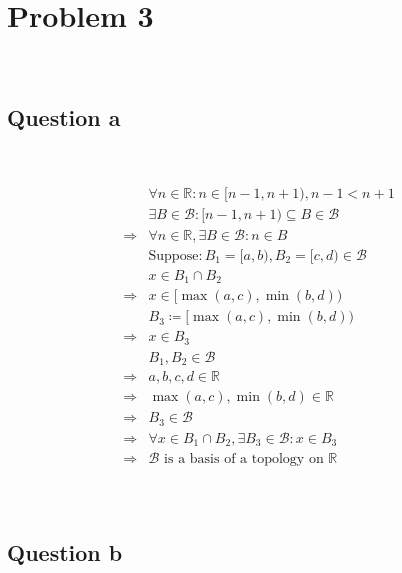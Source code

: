 \documentclass{article}
\begin{document}
\newpage

\section*{Problem 3}

~

\subsection*{Question a}

~

\begin{equation*}
    \begin{split}
        &\forall n \in \mathbb{R}:n\in [n-1,n+1),n-1<n+1\\
        &\exists B\in\mathcal{B} :[n-1,n+1)\subseteq B\in\mathcal{B}\\
        \Rightarrow&\forall n\in\mathbb{R},\exists B\in\mathcal{B}:n\in B\\
        &\text{Suppose}:B_1=[a,b),B_2=[c,d)\in\mathcal{B}\\
        &x\in B_1\cap B_2\\
        \Rightarrow&x\in[\max(a,c),\min(b,d))\\
        &B_3\coloneqq [\max(a,c),\min(b,d))\\
        \Rightarrow&x\in B_3\\
        &B_1,B_2\in \mathcal{B} \\
        \Rightarrow&a,b,c,d\in\mathbb{R} \\
        \Rightarrow&\max(a,c),\min(b,d)\in\mathbb{R} \\
        \Rightarrow&B_3\in\mathcal{B} \\
        \Rightarrow&\forall x\in B_1\cap B_2,\exists B_3\in\mathcal{B}:x\in B_3\\
        \Rightarrow&\mathcal{B} \text{ is a basis of a topology on }\mathbb{R} \\
    \end{split}
\end{equation*}

~

\subsection*{Question b}

~
\end{document}

